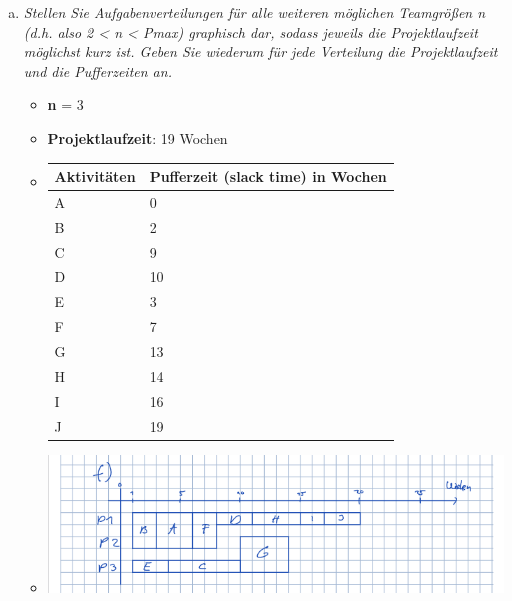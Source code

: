 \begin{enumerate}[(a)]
\newpage
    \item {\itshape Stellen Sie Aufgabenverteilungen für alle weiteren möglichen Teamgrößen n (d.h. also 2 < n < Pmax) graphisch dar, sodass jeweils die Projektlaufzeit möglichst kurz ist. Geben Sie wiederum für jede Verteilung die Projektlaufzeit und die Pufferzeiten an.}
        \begin{itemize}
            \item \textbf{n} = 3
            \item \textbf{Projektlaufzeit}: 19 Wochen
            \item[] \begin{tabular}{|l|l|}
                \hline
                \textbf{Aktivitäten} &  \textbf{Pufferzeit (slack time)} in Wochen\\ \hline  
                A & 0 \\ \hline 
                B & 2 \\ \hline 
                C & 9 \\ \hline 
                D & 10 \\ \hline 
                E & 3 \\ \hline 
                F & 7 \\ \hline 
                G & 13 \\ \hline 
                H & 14 \\ \hline 
                I & 16 \\ \hline 
                J & 19 \\ \hline 
            \end{tabular}
            
            \item[] \includegraphics[width=1\textwidth]{src/u12/task3/f_1.png} 
        \end{itemize}
        

\end{enumerate}
